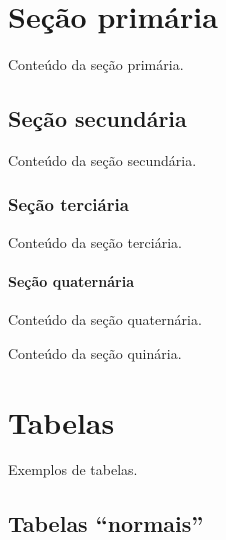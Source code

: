 \documentclass[serif]{uffstex}
\begin{document}
\pretextual

\imprimircapa

\imprimirfolhaderosto

\tableofcontents*
\clearpage

\textual

\chapter{Seção primária}

Conteúdo da seção primária.

\section{Seção secundária}

Conteúdo da seção secundária.

\subsection{Seção terciária}

Conteúdo da seção terciária.

\subsubsection{Seção quaternária}

Conteúdo da seção quaternária.


Conteúdo da seção quinária.

\newpage

\chapter{Tabelas}

Exemplos de tabelas.

\section{Tabelas \enquote{normais}}
\end{document}
